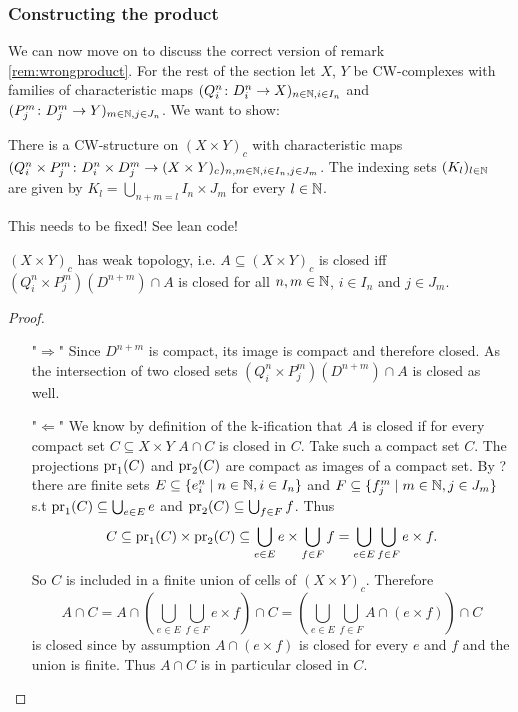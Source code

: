 \subsubsection{Constructing the product}

We can now move on to discuss the correct version of remark \ref{rem:wrongproduct}. 
For the rest of the section let $X$, $Y$ be CW-complexes with families of characteristic maps $(Q_i^n \colon D_i^n \to X)_{n \in \mathbb{N}, i \in I_n}$ and $(P_j^m \colon D_j^m \to Y)_{m \in \mathbb{N}, j \in J_n}$. 
We want to show:

\begin{lem}
    There is a CW-structure on $(X \times Y)_c$ with characteristic maps $(Q_i^n \times P_j^m \colon D_i^n \times D_j^m \to (X \times Y)_c)_{n,m \in \mathbb{N},i \in I_n,j \in J_m}$.
    The indexing sets $(K_l)_{l \in \mathbb{N}}$ are given by $K_l = \bigcup_{n + m = l}I_n \times J_m$ for every $l \in \mathbb{N}$.
\end{lem}

This needs to be fixed! See lean code!

\begin{lem}
    $(X \times Y)_c$ has weak topology,
    i.e. $A \subseteq (X \times Y)_c$ is closed iff $(Q_i^n \times P_j^m)(D^{n + m}) \cap A$ is closed for all $n, m \in \mathbb{N}$, $i \in I_n$ and $j \in J_m$.
\end{lem}
\begin{proof}~
    \begin{enumerate}
        \item["$\Rightarrow$"] Since $D^{n + m}$ is compact, its image is compact and therefore closed. As the intersection of two closed sets $(Q_i^n \times P_j^m)(D^{n + m}) \cap A$ is closed as well.
        \item["$\Leftarrow$"] We know by definition of the k-ification that $A$ is closed if for every compact set $C \subseteq X \times Y$ $A \cap C$ is closed in $C$.
        Take such a compact set $C$.
        The projections $\text{pr}_{1}(C)$ and $\text{pr}_{2}(C)$ are compact as images of a compact set. 
        By ? there are finite sets $E \subseteq \{e_i^n \mid n \in \mathbb{N}, i \in I_n \}$ and $F \subseteq \{f_j^m \mid m \in \mathbb{N}, j \in J_m \}$ s.t $\text{pr}_{1}(C) \subseteq \bigcup_{e \in E} e$ and $\text{pr}_{2}(C) \subseteq \bigcup_{f \in F} f$.
        Thus 
        \[C \subseteq \text{pr}_{1}(C) \times \text{pr}_{2}(C) \subseteq \bigcup_{e \in E} e \times \bigcup_{f \in F} f = \bigcup_{e \in E} \bigcup_{f \in F} e \times f.\] 
        So $C$ is included in a finite union of cells of $(X \times Y)_c$. 
        Therefore 
        \[A \cap C = A \cap \left (\bigcup_{e \in E} \bigcup_{f \in F} e \times f \right )\cap C = \left (\bigcup_{e \in E} \bigcup_{f \in F} A \cap (e \times f)\right ) \cap C\] 
        is closed since by assumption $A \cap (e \times f)$ is closed for every $e$ and $f$ and the union is finite. Thus $A \cap C$ is in particular closed in $C$.
    \qedhere
    \end{enumerate}
\end{proof}
